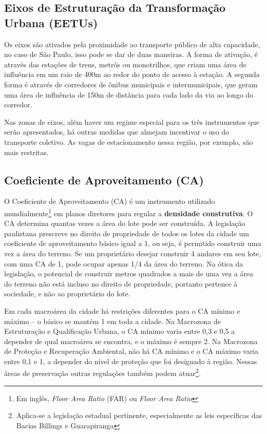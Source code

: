 \subsection*{Eixos de Estruturação da Transformação Urbana (EETUs)}

Os eixos são ativados pela proximidade ao transporte público de alta capacidade, no caso de São Paulo, isso pode se dar de duas maneiras. A forma de ativação, é através das estações de trens, metrôs ou monotrilhos, que criam uma área de influência em um raio de 400m ao redor do ponto de acesso à estação. A segunda forma é através de corredores de ônibus municipais e intermunicipais, que geram uma área de influência de 150m de distância para cada lado da via ao longo do corredor.

Nas zonas de eixos, além haver um regime especial para os três instrumentos que serão apresentados, há outras medidas que almejam incentivar o uso do transporte coletivo. As vagas de estacionamento nessa região, por exemplo, são mais restritas.

\subsection*{Coeficiente de Aproveitamento (CA)}

O Coeficiente de Aproveitamento (CA) é um instrumento utilizado mundialmente\footnote{Em inglês, \textit{Floor Area Ratio} (FAR) ou \textit{Floor Area Ratio}} em planos diretores para regular a \textbf{densidade construtiva}. O CA determina quantas vezes a área do lote pode ser construída. A legislação paulistana prescreve no direito de propriedade de todos os lotes da cidade um coeficiente de aproveitamento básico igual a 1, ou seja, é permitido construir uma vez a área do terreno. Se um proprietário desejar construir 4 andares em seu lote, com uma CA de 1, pode ocupar apenas 1/4 da área do terreno. Na ótica da legislação, o potencial de construir metros quadrados a mais de uma vez a área do terreno não está incluso no direito de propriedade, portanto pertence à sociedade, e não ao proprietário do lote.

Em cada macroárea da cidade há restrições diferentes para o CA mínimo e máximo -- o básico se mantém 1 em toda a cidade. Na Macrozona de Estruturação e Qualificação Urbana, o CA mínimo varia entre 0,3 e 0,5 a depender de qual macroárea se encontra, e o máximo é sempre 2. Na Macrozona de Proteção e Recuperação Ambiental, não há CA mínimo e o CA máximo varia entre 0,1 e 1, a depender do nível de proteção que foi designado à região. Nessas áreas de preservação outras regulações também podem atuar\footnote{Aplica-se a legislação estadual pertinente, especialmente as leis específicas das Bacias Billings e Guarapiranga}.

